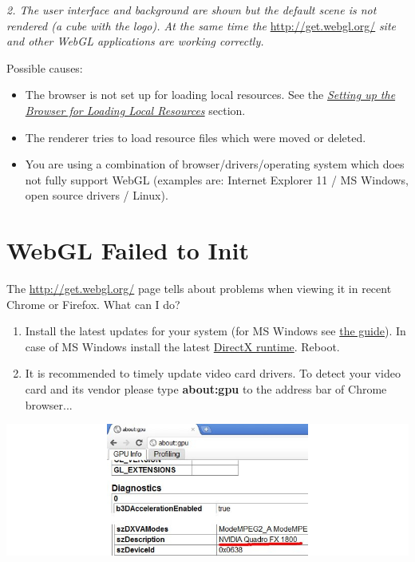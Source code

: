 \documentclass[a4paper,12pt,oneside]{sphinxmanual}
\begin{document}
\emph{2. The user interface and background are shown but the default scene is not rendered (a cube with the logo). At the same time the} \href{http://get.webgl.org/}{http://get.webgl.org/} \emph{site and other WebGL applications are working correctly.}

Possible causes:
\begin{itemize}
\item {} 
The browser is not set up for loading local resources. See the {\hyperref[setup:browser-for-local-loading]{\emph{Setting up the Browser for Loading Local Resources}}} section.

\item {} 
The renderer tries to load resource files which were moved or deleted.

\item {} 
You are using a combination of browser/drivers/operating system which does not fully support WebGL (examples are: Internet Explorer 11 / MS Windows, open source drivers / Linux).

\end{itemize}


\section{WebGL Failed to Init}
\label{problems_and_solutions:webgl}\label{problems_and_solutions:webgl-not-working}
The \href{http://get.webgl.org/}{http://get.webgl.org/} page tells about problems when viewing it in recent Chrome or Firefox. What can I do?
\begin{enumerate}
\item {} 
Install the latest updates for your system (for MS Windows see \href{http://support.microsoft.com/kb/311047}{the guide}). In case of MS Windows install the latest \href{http://www.microsoft.com/en-us/download/details.aspx?id=35}{DirectX runtime}. Reboot.

\item {} 
It is recommended to timely update video card drivers. To detect your video card and its vendor please type \textbf{about:gpu} to the address bar of Chrome browser...

\end{enumerate}

{\hfill\includegraphics[width=1.000\linewidth]{about_gpu_directx.jpg}\hfill}
\end{document}
